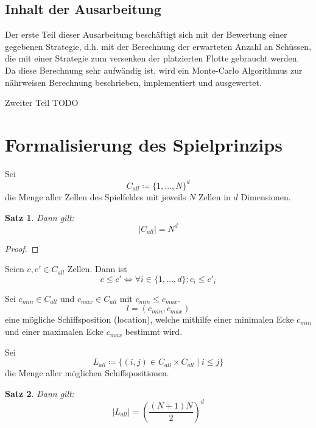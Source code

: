 \documentclass[a4paper,12pt]{llncs}
\numberwithin{equation}{section}
\newtheorem{satz}{Satz}
\begin{document}
\subsection{Inhalt der Ausarbeitung}

Der erste Teil dieser Ausarbeitung beschäftigt sich mit der Bewertung einer gegebenen Strategie, d.h. mit der Berechnung der erwarteten Anzahl an Schüssen, die mit einer Strategie zum versenken der platzierten Flotte gebraucht werden.
Da diese Berechnung sehr aufwändig ist, wird ein Monte-Carlo Algorithmus zur nährweisen Berechnung beschrieben, implementiert und ausgewertet.

Zweiter Teil TODO

\section{Formalisierung des Spielprinzips}

\begin{definition}
Sei
\[
C_{all} \coloneqq \{1, \dots, N\}^d
\]
die Menge aller Zellen des Spielfeldes mit jeweils $N$ Zellen in $d$ Dimensionen.
\end{definition}

\begin{satz}
Dann gilt:
\[
|C_{all}|=N^d
\]
\end{satz}

\begin{proof}
\end{proof}

\begin{definition}
Seien $c, c' \in C_{all}$ Zellen.
Dann ist
\[
c \leq c' \Leftrightarrow \forall i \in \{1, \dots, d\} \colon c_{i} \leq c'_{i} 
\]
\end{definition}

\begin{definition}
Sei $c_{min} \in C_{all}$ und $c_{max} \in C_{all}$ mit $c_{min} \leq c_{max}$.
\[
l=(c_{min}, c_{max})
\]
eine mögliche Schiffsposition (location), welche mithilfe einer minimalen Ecke $c_{min}$ und einer maximalen Ecke $c_{max}$ bestimmt wird.
\end{definition}

\begin{definition}
Sei 
\[
L_{all} \coloneqq
\{
(i, j) \in C_{all} \times C_{all}
\mid
i \leq j
\}
\] die Menge aller möglichen Schiffspositionen.
\end{definition}

\begin{satz}
Dann gilt:
\[
|L_{all}|=\left(\frac{(N+1) N}{2}\right)^d
\]
\end{satz}
\end{document}
